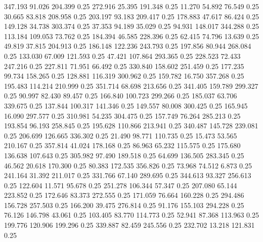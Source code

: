  347.193   91.026  204.399         0.25
 272.916   25.395  191.348         0.25
  11.270   54.892   76.549         0.25
  30.665   83.818  208.958         0.25
 203.197   93.183  209.417         0.25
 178.883   47.617   86.424         0.25
 149.128   34.738  303.374         0.25
  37.353   94.189   35.029         0.25
  94.931  148.017  344.288         0.25
 113.184  109.053   73.762         0.25
 184.394   46.585  228.396         0.25
  62.415   74.796   13.639         0.25
  49.819   37.815  204.913         0.25
 186.148  122.236  243.793         0.25
 197.856   80.944  268.084         0.25
 133.030   67.009  121.593         0.25
  47.421  107.864  293.365         0.25
 228.523   72.433  247.216         0.25
 227.811   71.951   66.492         0.25
 330.840  158.602  251.459         0.25
 177.235   99.734  158.265         0.25
 128.881  116.319  300.962         0.25
 159.782   16.750  357.268         0.25
 195.483  114.214  210.999         0.25
 351.714   68.698  213.656         0.25
 341.405  159.789  299.327         0.25
  90.997   82.430   89.457         0.25
 166.840  100.723  299.266         0.25
 185.037   63.706  339.675         0.25
 137.844  100.317  141.346         0.25
 149.557   80.008  300.425         0.25
 165.945   16.090  297.577         0.25
 310.981   54.235  304.475         0.25
 157.749   76.264  285.213         0.25
 193.854   96.193  258.845         0.25
 195.628  110.866  213.941         0.25
 340.487  145.728  239.081         0.25
 206.699  126.665  336.302         0.25
  21.490   98.771  110.735         0.25
  15.473   53.565  210.167         0.25
 357.814   41.024  178.168         0.25
  86.963   65.232  115.575         0.25
 175.680  136.638  107.643         0.25
 305.982   97.490  189.518         0.25
  64.699  136.505  283.345         0.25
  46.562   20.618  170.300         0.25
  80.383  172.535  356.826         0.25
  73.968   74.512    6.873         0.25
 241.164   31.392  211.017         0.25
 331.766   67.140  289.695         0.25
 344.613   93.327  256.613         0.25
 122.604   11.571   95.678         0.25
 251.278  106.344   57.347         0.25
 207.080   65.144  223.852         0.25
 172.646   83.373  272.555         0.25
 171.059   76.664  160.228         0.25
 294.486  156.728  257.503         0.25
 166.200   39.475  276.814         0.25
  91.176  155.103  294.228         0.25
  76.126  146.798   43.061         0.25
 103.405   83.770  114.773         0.25
  52.941   87.368  113.963         0.25
 199.776  120.906  199.296         0.25
 339.887   82.459  245.556         0.25
 232.702   13.218  121.831         0.25
